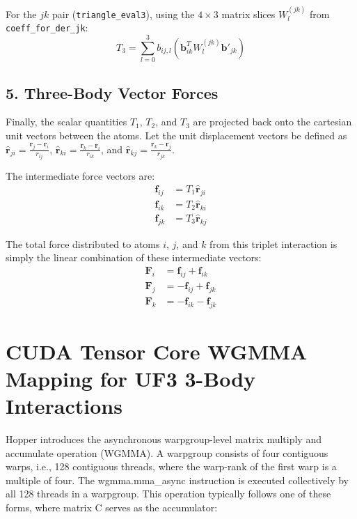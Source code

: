 \documentclass[12pt]{article}
\begin{document}
For the $jk$ pair (\texttt{triangle\_eval3}), using the $4 \times 3$ matrix slices $W^{(jk)}_l$ from \texttt{coeff\_for\_der\_jk}:
\begin{equation}
T_3 = \sum_{l=0}^{3} b_{ij, l} \left( \mathbf{b}_{ik}^T W^{(jk)}_{l} \mathbf{b}'_{jk} \right)
\end{equation}

\subsection*{5. Three-Body Vector Forces}
Finally, the scalar quantities $T_1$, $T_2$, and $T_3$ are projected back onto the cartesian unit vectors between the atoms. Let the unit displacement vectors be defined as $\hat{\mathbf{r}}_{ji} = \frac{\mathbf{r}_j - \mathbf{r}_i}{r_{ij}}$, $\hat{\mathbf{r}}_{ki} = \frac{\mathbf{r}_k - \mathbf{r}_i}{r_{ik}}$, and $\hat{\mathbf{r}}_{kj} = \frac{\mathbf{r}_k - \mathbf{r}_j}{r_{jk}}$.

The intermediate force vectors are:
\begin{align}
\mathbf{f}_{ij} &= T_1 \hat{\mathbf{r}}_{ji} \\
\mathbf{f}_{ik} &= T_2 \hat{\mathbf{r}}_{ki} \\
\mathbf{f}_{jk} &= T_3 \hat{\mathbf{r}}_{kj}
\end{align}

The total force distributed to atoms $i$, $j$, and $k$ from this triplet interaction is simply the linear combination of these intermediate vectors:
\begin{align}
\mathbf{F}_i &= \mathbf{f}_{ij} + \mathbf{f}_{ik} \\
\mathbf{F}_j &= -\mathbf{f}_{ij} + \mathbf{f}_{jk} \\
\mathbf{F}_k &= -\mathbf{f}_{ik} - \mathbf{f}_{jk}
\end{align}

\clearpage






\section*{CUDA Tensor Core WGMMA Mapping for UF3 3-Body Interactions}


Hopper introduces the asynchronous warpgroup-level matrix multiply and accumulate operation (WGMMA). A warpgroup consists of four contiguous warps, i.e., 128 contiguous threads, where the warp-rank of the first warp is a multiple of four. The wgmma.mma\_async instruction is executed collectively by all 128 threads in a warpgroup. This operation typically follows one of these forms, where matrix C serves as the accumulator:
\end{document}
